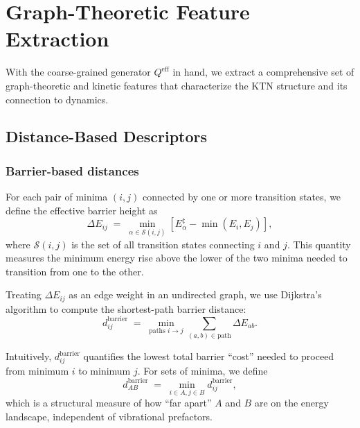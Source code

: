 
\section{Graph-Theoretic Feature Extraction}\label{sec:features}

With the coarse-grained generator $Q^{\mathrm{eff}}$ in hand, we extract a
comprehensive set of graph-theoretic and kinetic features that characterize the KTN
structure and its connection to dynamics.

\subsection{Distance-Based Descriptors}\label{subsec:distances}

\subsubsection{Barrier-based distances}

For each pair of minima $(i,j)$ connected by one or more transition states, we define
the effective barrier height as
\begin{equation}\label{eq:barrier}
  \Delta E_{ij}
  \;=\;
  \min_{\alpha \in \mathcal{S}(i,j)}
  \left[ E_\alpha^\ddagger - \min(E_i, E_j) \right],
\end{equation}
where $\mathcal{S}(i,j)$ is the set of all transition states connecting $i$ and $j$.
This quantity measures the minimum energy rise above the lower of the two minima
needed to transition from one to the other.

Treating $\Delta E_{ij}$ as an edge weight in an undirected graph, we use Dijkstra's
algorithm to compute the shortest-path barrier distance:
\begin{equation}\label{eq:dijkstra}
  d^{\mathrm{barrier}}_{ij}
  \;=\;
  \min_{\text{paths } i \to j}
  \sum_{(a,b) \in \text{path}} \Delta E_{ab}.
\end{equation}

Intuitively, $d^{\mathrm{barrier}}_{ij}$ quantifies the lowest total barrier ``cost''
needed to proceed from minimum $i$ to minimum $j$. For sets of minima, we define
\begin{equation}
  d^{\mathrm{barrier}}_{AB}
  \;=\;
  \min_{i \in A, j \in B} d^{\mathrm{barrier}}_{ij},
\end{equation}
which is a structural measure of how ``far apart'' $A$ and $B$ are on the energy
landscape, independent of vibrational prefactors.

